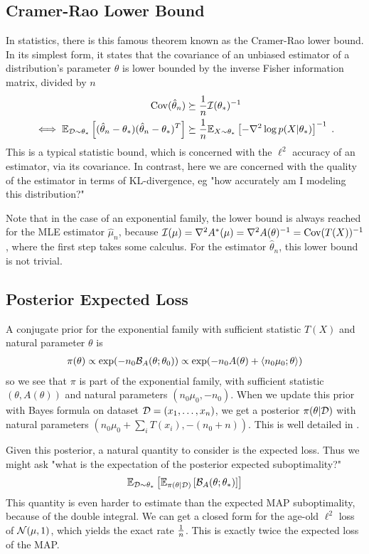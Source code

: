 \documentclass{article}
\newcommand*{\expect}[2][]{\ensuremath{\mathbb{E}_{#1} \left[ #2 \right] }} %
\newcommand{\logpart}{A}
\newcommand{\conj}{\logpart^*}
\newcommand{\bregman}{\cB_\logpart}
\newcommand{\natp}{\theta}
\begin{document}
\subsection{Cramer-Rao Lower Bound}
In statistics, there is this famous theorem known as the Cramer-Rao lower bound. In its simplest form, it states that the covariance of an unbiased estimator of a distribution's parameter $\natp$ is lower bounded by the inverse Fisher information matrix, divided by $n$
\begin{align}
    \Cov(\hat \natp_n)  
    &\succeq \inv{n} \cI(\natp_*)^{-1} \\
    \iff
    \expect[\cD\sim \natp_*]{(\hat \natp_n - \natp_*)(\hat \natp_n - \natp_*)^T}
    &\succeq \inv{n} \expect[X\sim \natp_*]{-\nabla^2 \log p(X|\natp_*)}^{-1} \; .
\end{align}
This is a typical statistic bound, which is concerned with the $\ell^2$ accuracy of an estimator, via its covariance. In contrast, here we are concerned with the quality of the estimator in terms of KL-divergence, eg "how accurately am I modeling this distribution?"

Note that in the case of an exponential family, the lower bound is always reached for the MLE estimator $\hat \mu_n$, because $\cI(\mu) = \nabla^2 \conj(\mu) = \nabla^2 \logpart(\natp)^{-1} = \Cov(T(X))^{-1}$, where the first step takes some calculus. For the estimator $\hat \natp_n$, this lower bound is not trivial.

\subsection{Posterior Expected Loss}

A conjugate prior for the exponential family with sufficient statistic $T(X)$ and natural parameter $\natp$ is 
\begin{align}
    \pi(\natp) 
    \propto \exp(-n_0 \bregman(\natp ; \natp_0)) 
    \propto \exp(-n_0 \logpart(\natp) + \langle n_0 \mu_0 ; \natp \rangle)
\end{align}
so we see that $\pi$ is part of the exponential family, with sufficient statistic $(\natp, \logpart(\natp))$ and natural parameters $(n_0 \mu_0 , -n_0)$. When we update this prior with Bayes formula on dataset ${\mathcal D}=(x_1,\dots,x_n)$, we get a posterior $\pi(\natp | \cD)$ with natural parameters $(n_0 \mu_0 + \sum_i T(x_i) , -(n_0 + n))$. This is well detailed in \citet{agarwal2010geometric}. 

Given this posterior, a natural quantity to consider is the expected loss. Thus we might ask "what is the expectation of the posterior expected suboptimality?"
\begin{align}
    \expect[\cD\sim\natp_*]{\expect[\pi(\natp|\cD)]{\bregman(\natp ; \natp_*)}}
\end{align}
This quantity is even harder to estimate than the expected MAP suboptimality, because of the double integral. We can get a closed form for the age-old $\ell^2$ loss of ${\mathcal N}(\mu, 1)$, which yields the exact rate $\frac{1}{n}$. This is exactly twice the expected loss of the MAP.
\end{document}
